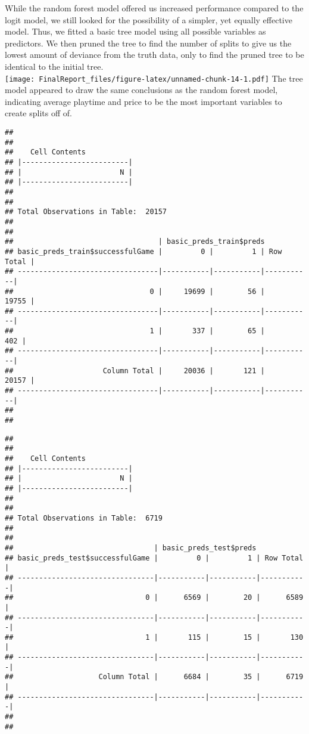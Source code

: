 \documentclass[]{article}
\begin{document}
While the random forest model offered us increased performance compared
to the logit model, we still looked for the possibility of a simpler,
yet equally effective model. Thus, we fitted a basic tree model using
all possible variables as predictors. We then pruned the tree to find
the number of splits to give us the lowest amount of deviance from the
truth data, only to find the pruned tree to be identical to the initial
tree.\\
\texttt{[image: FinalReport\_files/figure-latex/unnamed-chunk-14-1.pdf]}
The tree model appeared to draw the same conclusions as the random
forest model, indicating average playtime and price to be the most
important variables to create splits off of.

\begin{verbatim}
## 
##  
##    Cell Contents
## |-------------------------|
## |                       N |
## |-------------------------|
## 
##  
## Total Observations in Table:  20157 
## 
##  
##                                  | basic_preds_train$preds 
## basic_preds_train$successfulGame |         0 |         1 | Row Total | 
## ---------------------------------|-----------|-----------|-----------|
##                                0 |     19699 |        56 |     19755 | 
## ---------------------------------|-----------|-----------|-----------|
##                                1 |       337 |        65 |       402 | 
## ---------------------------------|-----------|-----------|-----------|
##                     Column Total |     20036 |       121 |     20157 | 
## ---------------------------------|-----------|-----------|-----------|
## 
## 
\end{verbatim}

\begin{verbatim}
## 
##  
##    Cell Contents
## |-------------------------|
## |                       N |
## |-------------------------|
## 
##  
## Total Observations in Table:  6719 
## 
##  
##                                 | basic_preds_test$preds 
## basic_preds_test$successfulGame |         0 |         1 | Row Total | 
## --------------------------------|-----------|-----------|-----------|
##                               0 |      6569 |        20 |      6589 | 
## --------------------------------|-----------|-----------|-----------|
##                               1 |       115 |        15 |       130 | 
## --------------------------------|-----------|-----------|-----------|
##                    Column Total |      6684 |        35 |      6719 | 
## --------------------------------|-----------|-----------|-----------|
## 
## 
\end{verbatim}
\end{document}

